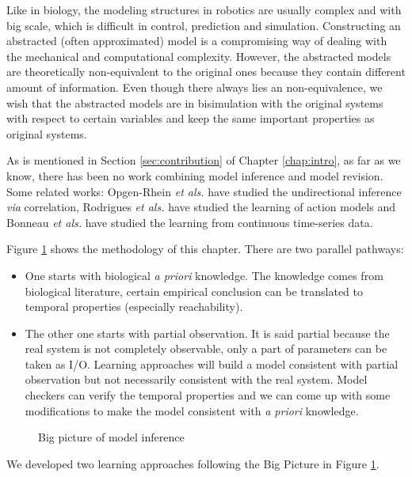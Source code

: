 Like in biology, the modeling structures in robotics are usually complex and with big scale, which is difficult in control, prediction and simulation.
Constructing an abstracted (often approximated) model is a compromising way of dealing with the mechanical and computational complexity.
However, the abstracted models are theoretically non-equivalent to the original ones because they contain different amount of information.
Even though there always lies an non-equivalence, we wish that the abstracted models are in bisimulation with the original systems with respect to certain variables and keep the same important properties as original systems.

As is mentioned in Section \ref{sec:contribution} of Chapter \ref{chap:intro}, as far as we know, there has been no work combining model inference and model revision.
Some related works: Opgen-Rhein \textit{et als.} have \cite{opgen2007correlation} studied the undirectional inference \textit{via} correlation, Rodrigues \textit{et als.} \cite{rodrigues2011active} have studied the learning of action models and Bonneau \textit{et als.} \cite{bonneau2006inferelator} have studied the learning from continuous time-series data.

Figure \ref{fig:bigPicture} shows the methodology of this chapter.
There are two parallel pathways: 
\begin{itemize}
    \item One starts with biological \textit{a priori} knowledge.
    The knowledge comes from biological literature, certain empirical conclusion can be translated to temporal properties (especially reachability).
    \item The other one starts with partial observation.
    It is said partial because the real system is not completely observable, only a part of parameters can be taken as I/O. 
    Learning approaches will build a model consistent with partial observation but not necessarily consistent with the real system.
    Model checkers can verify the temporal properties and we can come up with some modifications to make the model consistent with \textit{a priori} knowledge.
\end{itemize}

\begin{figure}[ht]
    \centering
    
    \caption{Big picture of model inference}\label{fig:bigPicture}
\end{figure}

We developed two learning approaches following the Big Picture in Figure \ref{fig:bigPicture}.

